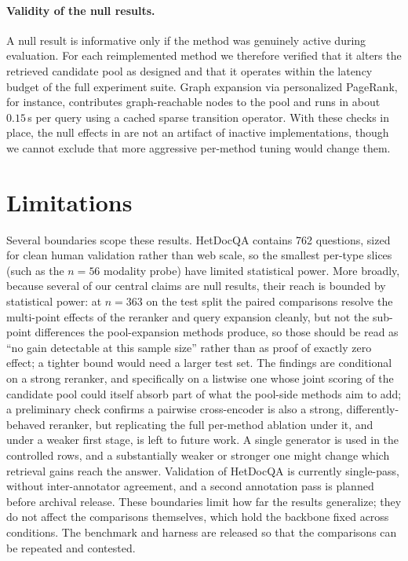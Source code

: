 \documentclass[10pt,twocolumn]{article}
\begin{document}
\paragraph{Validity of the null results.}
A null result is informative only if the method was genuinely active during
evaluation. For each reimplemented method we therefore verified that it alters
the retrieved candidate pool as designed and that it operates within the latency
budget of the full experiment suite. Graph expansion via personalized PageRank,
for instance, contributes graph-reachable nodes to the pool and runs in about
$0.15$\,s per query using a cached sparse transition operator. With these checks
in place, the null effects in  are not an artifact of inactive
implementations, though we cannot exclude that more aggressive per-method tuning
would change them.

\section{Limitations}\label{sec:limits}
Several boundaries scope these results. HetDocQA contains 762 questions, sized
for clean human validation rather than web scale, so the smallest per-type slices
(such as the $n{=}56$ modality probe) have limited statistical power. More
broadly, because several of our central claims are null results, their reach is
bounded by statistical power: at $n{=}363$ on the test split the paired
comparisons resolve the multi-point effects of the reranker and query expansion
cleanly, but not the sub-point differences the pool-expansion methods produce, so
those should be read as ``no gain detectable at this sample size'' rather than as
proof of exactly zero effect; a tighter bound would need a larger test set. The
findings are conditional on a strong reranker, and specifically on a listwise
one whose joint scoring of the candidate pool could itself absorb part of what the
pool-side methods aim to add; a preliminary check confirms a pairwise
cross-encoder is also a strong, differently-behaved reranker, but replicating the
full per-method ablation under it, and under a weaker first stage, is left to
future work. A single generator is used
in the controlled rows, and a substantially weaker or stronger one might change
which retrieval gains reach the answer. Validation of HetDocQA is currently
single-pass, without inter-annotator agreement, and a second annotation pass is
planned before archival release. These boundaries limit how far the results
generalize; they do not affect the comparisons themselves, which hold the
backbone fixed across conditions. The benchmark and harness are released so that
the comparisons can be repeated and contested.
\end{document}
